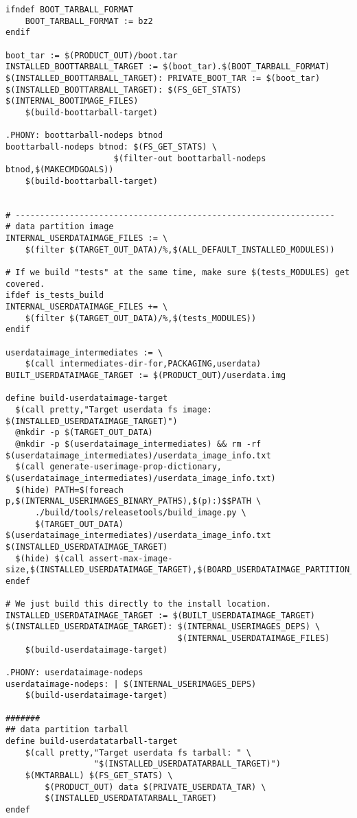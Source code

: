 \documentclass[12pt,a4paper]{article}
\begin{document}
\begin{verbatim}
ifndef BOOT_TARBALL_FORMAT
    BOOT_TARBALL_FORMAT := bz2
endif

boot_tar := $(PRODUCT_OUT)/boot.tar
INSTALLED_BOOTTARBALL_TARGET := $(boot_tar).$(BOOT_TARBALL_FORMAT)
$(INSTALLED_BOOTTARBALL_TARGET): PRIVATE_BOOT_TAR := $(boot_tar)
$(INSTALLED_BOOTTARBALL_TARGET): $(FS_GET_STATS) $(INTERNAL_BOOTIMAGE_FILES)
	$(build-boottarball-target)

.PHONY: boottarball-nodeps btnod
boottarball-nodeps btnod: $(FS_GET_STATS) \
                      $(filter-out boottarball-nodeps btnod,$(MAKECMDGOALS))
	$(build-boottarball-target)


# -----------------------------------------------------------------
# data partition image
INTERNAL_USERDATAIMAGE_FILES := \
    $(filter $(TARGET_OUT_DATA)/%,$(ALL_DEFAULT_INSTALLED_MODULES))

# If we build "tests" at the same time, make sure $(tests_MODULES) get covered.
ifdef is_tests_build
INTERNAL_USERDATAIMAGE_FILES += \
    $(filter $(TARGET_OUT_DATA)/%,$(tests_MODULES))
endif

userdataimage_intermediates := \
    $(call intermediates-dir-for,PACKAGING,userdata)
BUILT_USERDATAIMAGE_TARGET := $(PRODUCT_OUT)/userdata.img

define build-userdataimage-target
  $(call pretty,"Target userdata fs image: $(INSTALLED_USERDATAIMAGE_TARGET)")
  @mkdir -p $(TARGET_OUT_DATA)
  @mkdir -p $(userdataimage_intermediates) && rm -rf $(userdataimage_intermediates)/userdata_image_info.txt
  $(call generate-userimage-prop-dictionary, $(userdataimage_intermediates)/userdata_image_info.txt)
  $(hide) PATH=$(foreach p,$(INTERNAL_USERIMAGES_BINARY_PATHS),$(p):)$$PATH \
      ./build/tools/releasetools/build_image.py \
      $(TARGET_OUT_DATA) $(userdataimage_intermediates)/userdata_image_info.txt $(INSTALLED_USERDATAIMAGE_TARGET)
  $(hide) $(call assert-max-image-size,$(INSTALLED_USERDATAIMAGE_TARGET),$(BOARD_USERDATAIMAGE_PARTITION_SIZE),yaffs)
endef

# We just build this directly to the install location.
INSTALLED_USERDATAIMAGE_TARGET := $(BUILT_USERDATAIMAGE_TARGET)
$(INSTALLED_USERDATAIMAGE_TARGET): $(INTERNAL_USERIMAGES_DEPS) \
                                   $(INTERNAL_USERDATAIMAGE_FILES)
	$(build-userdataimage-target)

.PHONY: userdataimage-nodeps
userdataimage-nodeps: | $(INTERNAL_USERIMAGES_DEPS)
	$(build-userdataimage-target)

#######
## data partition tarball
define build-userdatatarball-target
    $(call pretty,"Target userdata fs tarball: " \
                  "$(INSTALLED_USERDATATARBALL_TARGET)")
    $(MKTARBALL) $(FS_GET_STATS) \
		$(PRODUCT_OUT) data $(PRIVATE_USERDATA_TAR) \
		$(INSTALLED_USERDATATARBALL_TARGET)
endef


\end{verbatim}
\end{document}
